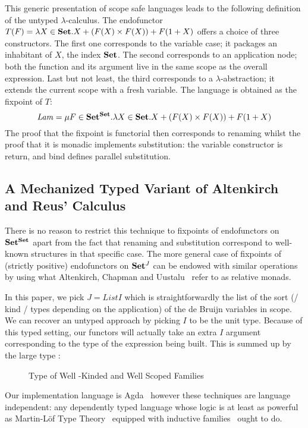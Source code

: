 This generic presentation of scope safe languages leads to the following
definition of the untyped $\lambda$-calculus. The endofunctor
$T(F) = \lambda X \in \mathbf{Set}{}. X + (F(X) \times F(X)) + F(1 + X)$
offers a choice of three constructors. The first one corresponds to the variable
case; it packages an inhabitant of $X$, the index $\mathbf{Set}{}$. The second corresponds
to an application node; both the function and its argument live in the same
scope as the overall expression. Last but not least, the third corresponds to
a $\lambda$-abstraction; it extends the current scope with a fresh variable.
The language is obtained as the fixpoint of $T$:
\[
   \mathit{Lam} = \mu F \in \mathbf{Set}{}^{\mathbf{Set}{}}.
   \lambda X \in \mathbf{Set}{}. X + (F(X) \times F(X)) + F(1 + X)
\]
The proof that the fixpoint is functorial then corresponds to renaming
whilst the proof that it is monadic implements substitution: the variable
constructor is return, and bind defines parallel substitution.

\subsection{A Mechanized Typed Variant of Altenkirch and Reus' Calculus}

There is no reason to restrict this technique to fixpoints of endofunctors
on $\mathbf{Set}{}^{\mathbf{Set}{}}$ apart from the fact that renaming and substitution
correspond to well-known structures in that specific case. The more general
case of fixpoints of (strictly positive) endofunctors on $\mathbf{Set}{}^J$ can be
endowed with similar operations by using what Altenkirch, Chapman and
Uustalu~\citeyear{Altenkirch2010, JFR4389} refer to as relative monads.

In this paper, we pick $J = \mathit{List} I$ which is straightforwardly the list
of the sort (/ kind / types depending on the application) of the de Bruijn variables
in scope. We can recover an untyped approach by picking $I$ to be the unit type.
Because of this typed setting, our functors will actually take an extra $I$ argument
corresponding to the type of the expression being built. This is summed up by
the large type :

\begin{figure}[h]
\caption{Type of Well -Kinded and Well Scoped Families}
\end{figure}

Our implementation language is Agda~\cite{norell2009dependently} however
these techniques are language independent: any dependently typed language
whose logic is at least as powerful as Martin-L\"of Type
Theory~\cite{martin1982constructive} equipped with inductive
families~\cite{dybjer1994inductive} ought to do.

